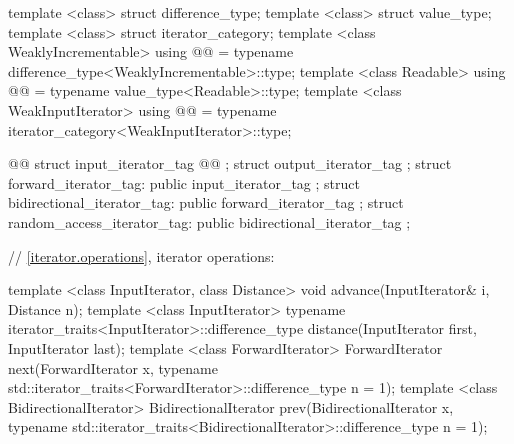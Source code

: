 \begin{addedblock}
\begin{codeblock}
  template <class> struct difference_type;
  template <class> struct value_type;
  template <class> struct iterator_category;
  template <class WeaklyIncrementable> using @@
    = typename difference_type<WeaklyIncrementable>::type;
  template <class Readable> using @@
    = typename value_type<Readable>::type;
  template <class WeakInputIterator> using @@
    = typename iterator_category<WeakInputIterator>::type;

\end{codeblock}
\end{addedblock}
\begin{codeblock}
  @@
  struct input_iterator_tag @@{ };
  struct output_iterator_tag { };
  struct forward_iterator_tag: public input_iterator_tag { };
  struct bidirectional_iterator_tag: public forward_iterator_tag { };
  struct random_access_iterator_tag: public bidirectional_iterator_tag { };

  // \ref{iterator.operations}, iterator operations:
\end{codeblock}
\begin{removedblock}
\begin{codeblock}
  template <class InputIterator, class Distance>
    void advance(InputIterator& i, Distance n);
  template <class InputIterator>
    typename iterator_traits<InputIterator>::difference_type
    distance(InputIterator first, InputIterator last);
  template <class ForwardIterator>
    ForwardIterator next(ForwardIterator x,
      typename std::iterator_traits<ForwardIterator>::difference_type n = 1);
  template <class BidirectionalIterator>
    BidirectionalIterator prev(BidirectionalIterator x,
      typename std::iterator_traits<BidirectionalIterator>::difference_type n = 1);
\end{codeblock}
\end{removedblock}
